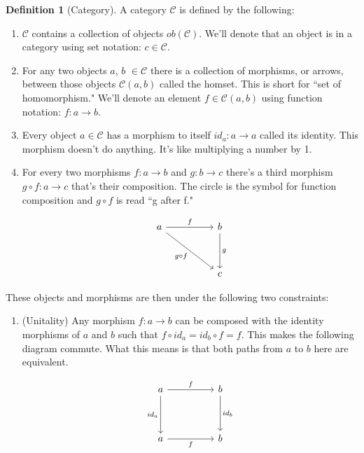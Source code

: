 \documentclass{article}
\theoremstyle{definition}
\newtheorem{definition}{Definition}
\begin{document}
\begin{definition}[Category]
    A category $\mathcal{C}$ is defined by the following:
    \begin{enumerate}
        \item $\mathcal{C}$ contains a collection of objects $ob(\mathcal{C})$. We'll denote that an object is in a category using set notation: $c\in\mathcal{C}$.
        \item For any two objects $a$, $b$ $\in \mathcal{C}$ there is a collection of morphisms, or arrows, between those objects $\mathcal{C}(a,b)$ called the homset. This is short for ``set of homomorphism." We'll denote an element $f\in\mathcal{C}(a,b)$ using function notation: $f:a\rightarrow b$.
        \item Every object $a\in \mathcal{C}$ has a morphism to itself $id_a:a\rightarrow a$ called its identity. This morphism doesn't do anything. It's like multiplying a number by 1.
        \item For every two morphisms $f:a\rightarrow b$ and $g: b\rightarrow c$ there's a third morphism $g\circ f:a\rightarrow c$ that's their composition. The circle is the symbol for function composition and $g \circ f$ is read ``g after f."

              \[\begin{tikzcd}
                      a && b \\
                      \\
                      && c
                      \arrow["f", from=1-1, to=1-3]
                      \arrow["g", from=1-3, to=3-3]
                      \arrow["{g\circ f}"', from=1-1, to=3-3]
                  \end{tikzcd}\]

    \end{enumerate}
    These objects and morphisms are then under the following two constraints:
    \begin{enumerate}
        \item (Unitality) Any morphism $f:a\rightarrow b$ can be composed with the identity morphisms of $a$ and $b$ such that $f\circ id_a=id_b\circ f=f$. This makes the following diagram commute. What this means is that both paths from $a$ to $b$ here are equivalent.

              \[\begin{tikzcd}
                      a && b \\
                      \\
                      a && b
                      \arrow["f", from=1-1, to=1-3]
                      \arrow["{id_a}"', from=1-1, to=3-1]
                      \arrow["{id_b}", from=1-3, to=3-3]
                      \arrow["f"', from=3-1, to=3-3]
                  \end{tikzcd}\]


\end{enumerate}
\end{definition}
\end{document}

